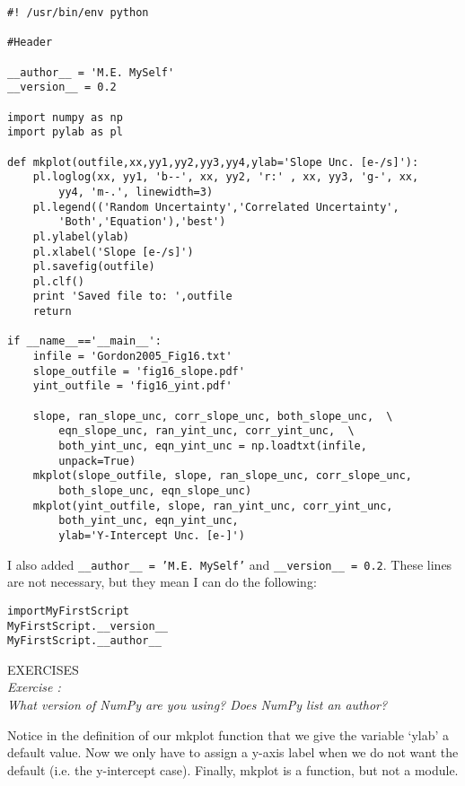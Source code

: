 \begin{verbatim}
#! /usr/bin/env python

#Header

__author__ = 'M.E. MySelf'
__version__ = 0.2

import numpy as np
import pylab as pl

def mkplot(outfile,xx,yy1,yy2,yy3,yy4,ylab='Slope Unc. [e-/s]'):
    pl.loglog(xx, yy1, 'b--', xx, yy2, 'r:' , xx, yy3, 'g-', xx,  
        yy4, 'm-.', linewidth=3) 
    pl.legend(('Random Uncertainty','Correlated Uncertainty',  
        'Both','Equation'),'best')
    pl.ylabel(ylab) 
    pl.xlabel('Slope [e-/s]') 
    pl.savefig(outfile) 
    pl.clf()
    print 'Saved file to: ',outfile 
    return  
    
if __name__=='__main__': 
    infile = 'Gordon2005_Fig16.txt' 
    slope_outfile = 'fig16_slope.pdf'  
    yint_outfile = 'fig16_yint.pdf'  
    
    slope, ran_slope_unc, corr_slope_unc, both_slope_unc,  \
        eqn_slope_unc, ran_yint_unc, corr_yint_unc,  \
        both_yint_unc, eqn_yint_unc = np.loadtxt(infile, 
        unpack=True) 
    mkplot(slope_outfile, slope, ran_slope_unc, corr_slope_unc,  
        both_slope_unc, eqn_slope_unc) 
    mkplot(yint_outfile, slope, ran_yint_unc, corr_yint_unc,  
        both_yint_unc, eqn_yint_unc,
        ylab='Y-Intercept Unc. [e-]')
\end{verbatim}

I also added \texttt{\_\_author\_\_ = 'M.E. MySelf'} and
\texttt{\_\_version\_\_ = 0.2}.  These lines are not necessary, but
they mean I can do the following:
\begin{alltt}
\pytab import MyFirstScript
\pytab MyFirstScript.__version__
\pytab MyFirstScript.__author__
\end{alltt}

{\color{blue} {\sf\small EXERCISES}} \\
{\it Exercise  :  \\
  What version of NumPy are you using?  Does NumPy list an author?
}

Notice in the definition of our mkplot function that we give the
variable `ylab' a default value.  Now we only have to assign a y-axis
label when we do not want the default (i.e. the y-intercept case).
Finally, {\sf \small mkplot} is a function, but not a module.

